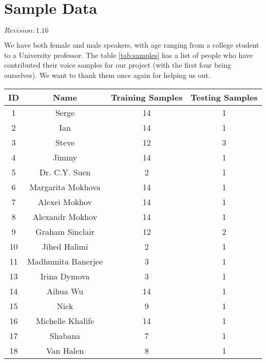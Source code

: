 \section{Sample Data}

$Revision: 1.16 $

We have both female and male speakers, with age
ranging from a college student to a University professor.
The table \ref{tab:samples} has a list of people who have contributed their
voice samples for our project (with the first four being ourselves).
We want to thank them once again for helping us out.

\begin{table}
\begin{minipage}[b]{\textwidth}
\centering
\begin{tabular}{|c|c|c|c|} \hline
ID          & Name               & Training Samples & Testing Samples\\ \hline\hline
1           & Serge              & 14               & 1 \\
2           & Ian                & 14               & 1 \\
3           & Steve              & 12               & 3 \\
4           & Jimmy              & 14               & 1 \\
5           & Dr. C.Y. Suen      & 2                & 1 \\
6           & Margarita Mokhova  & 14               & 1 \\
7           & Alexei Mokhov      & 14               & 1 \\
8           & Alexandr Mokhov    & 14               & 1 \\
9           & Graham Sinclair    & 12               & 2 \\
10          & Jihed Halimi       & 2                & 1 \\
11          & Madhumita Banerjee & 3                & 1 \\
13          & Irina Dymova       & 3                & 1 \\
14          & Aihua Wu           & 14               & 1 \\
15          & Nick               & 9                & 1 \\
16          & Michelle Khalife   & 14               & 1 \\
17          & Shabana            & 7                & 1 \\
18          & Van Halen          & 8                & 1 \\

\end{tabular}
\end{minipage}
\end{table}
